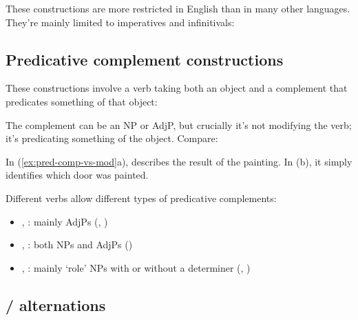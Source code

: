 These constructions are more restricted in English than in many other languages. They're mainly limited to imperatives and infinitivals:

\ea\label{ex:serial-forms}
   \z
\z{}

\subsection{Predicative complement constructions}

These constructions involve a verb taking both an object and a complement that predicates something of that object:

\ea\label{ex:pred-comp}
   \z
\z
The complement can be an NP or AdjP, but crucially it's not modifying the verb; it's predicating something of the object. Compare:

\ea\label{ex:pred-comp-vs-mod}
   \z
\z
In (\ref{ex:pred-comp-vs-mod}a),  describes the result of the painting. In (b), it simply identifies which door was painted.

Different verbs allow different types of predicative complements:
\begin{itemize}[noitemsep]
   \item {}, : mainly AdjPs (, )
   \item {}, : both NPs and AdjPs ()
   \item {}, : mainly `role' NPs with or without a determiner (, )
\end{itemize}

\subsection{/ alternations}

